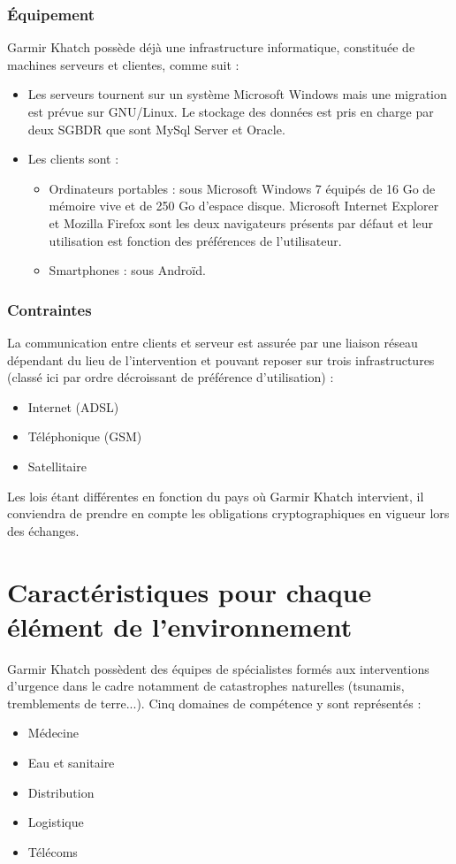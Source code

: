 \documentclass[11pt,fleqn]{book} %
\begin{document}
\subsubsection{Équipement}
Garmir Khatch possède déjà une infrastructure informatique, constituée de machines serveurs et clientes, comme suit :
\begin{itemize}
\item Les serveurs tournent sur un système Microsoft Windows mais une migration est prévue sur GNU/Linux. Le stockage des données est pris en charge par deux SGBDR que sont MySql Server et Oracle.
\item Les clients sont :
\begin{itemize}
\item Ordinateurs portables : sous Microsoft Windows 7 équipés de 16 Go de mémoire vive et de 250 Go d'espace disque. Microsoft Internet Explorer et Mozilla Firefox sont les deux navigateurs présents par défaut et leur utilisation est fonction des préférences de l'utilisateur.
\item Smartphones : sous Androïd.
\end{itemize}
\end{itemize}

\subsubsection{Contraintes}
La communication entre clients et serveur est assurée par une liaison réseau dépendant du lieu de l'intervention et pouvant reposer sur trois infrastructures (classé ici par ordre décroissant de préférence d'utilisation) :
\begin{itemize}
\item Internet (ADSL)
\item Téléphonique (GSM)
\item Satellitaire
\end{itemize}
Les lois étant différentes en fonction du pays où Garmir Khatch intervient, il conviendra de prendre en compte les obligations cryptographiques en vigueur lors des échanges.

\section{Caractéristiques pour chaque élément de l'environnement}
Garmir Khatch possèdent des équipes de spécialistes formés aux interventions d'urgence dans le cadre notamment de catastrophes naturelles (tsunamis, tremblements de terre...).
Cinq domaines de compétence y sont représentés :
\begin{itemize}
\item Médecine
\item Eau et sanitaire
\item Distribution
\item Logistique
\item Télécoms
\end{itemize}
\end{document}
